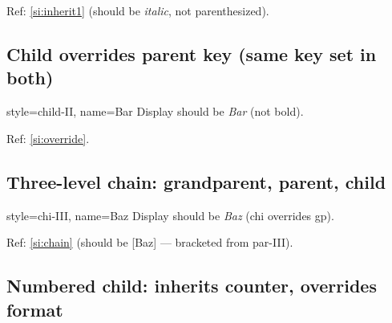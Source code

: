 \documentclass{article}
\begin{document}
Ref: \ref{si:inherit1} (should be \textit{italic}, not parenthesized).

\subsection{Child overrides parent key (same key set in both)}



\begin{prop}
  \item[style=child-II, name=Bar]
    Display should be \textit{Bar} (not bold).  \label{si:override}
\end{prop}

Ref: \ref{si:override}.

\subsection{Three-level chain: grandparent, parent, child}



\begin{prop}
  \item[style=chi-III, name=Baz]
    Display should be \textit{Baz} (chi overrides gp).  \label{si:chain}
\end{prop}

Ref: \ref{si:chain} (should be [Baz] — bracketed from par-III).

\subsection{Numbered child: inherits counter, overrides format}
\end{document}
